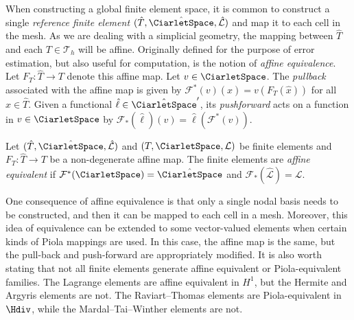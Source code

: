 When constructing a global finite element space, it is common to
construct a single \emph{reference finite element} $(\hat{T},
\hat{\CiarletSpace}, \hat{\mathcal{L}})$ and map it to each cell in
the mesh. As we are dealing with a simplicial geometry, the mapping
between $\hat{T}$ and each $T \in \mathcal{T}_h$ will be
affine. Originally defined for the purpose of error estimation, but
also useful for computation, is the notion of \emph{affine
  equivalence}. Let $F_T: \hat{T} \rightarrow T$ denote this affine
map. Let $v \in \CiarletSpace$. The \emph{pullback} associated with
the affine map is given by $\mathcal{F}^*(v)(\hat{x}) =
v(F_T(\hat{x}))$ for all $\hat{x} \in \hat{T}$. Given a functional
$\hat{\ell} \in \hat{\CiarletSpace}'$, its \emph{pushforward} acts on
a function in $v \in \CiarletSpace$ by $\mathcal{F}_*(\hat{\ell})(v) =
\hat{\ell}(\mathcal{F}^*(v))$.
\begin{definition}
  Let $(\hat{T}, \hat{\CiarletSpace}, \hat{\mathcal{L}})$ and
  $(T, \CiarletSpace, \mathcal{L})$ be finite elements and $F_T:
  \hat{T} \rightarrow T$ be a non-degenerate affine map. The finite
  elements are \emph{affine equivalent} if
  $\mathcal{F}^*(\CiarletSpace) = \hat{\CiarletSpace}$ and
  $\mathcal{F}_*(\hat{\mathcal{L}}) = \mathcal{L}$.
\end{definition}
One consequence of affine equivalence is that only a single nodal
basis needs to be constructed, and then it can be mapped to each cell
in a mesh. Moreover, this idea of equivalence can be extended to some
vector-valued elements when certain kinds of Piola mappings are used.
In this case, the affine map is the same, but the pull-back and
push-forward are appropriately modified.  It is also worth stating
that not all finite elements generate affine equivalent or
Piola-equivalent families. The Lagrange elements are affine equivalent
in $H^1$, but the Hermite and Argyris elements are not. The
Raviart--Thomas elements are Piola-equivalent in $\Hdiv$, while the
Mardal--Tai--Winther elements are not.

